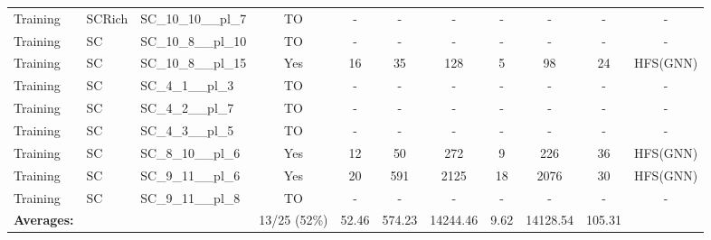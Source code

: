 \documentclass{article}
\begin{document}
\begin{tabular}{lllcccccccc}
Training & SCRich & SC\_10\_10\_\_pl\_7 & TO & - & - & - & - & - & - & - \\
Training & SC & SC\_10\_8\_\_pl\_10 & TO & - & - & - & - & - & - & - \\
Training & SC & SC\_10\_8\_\_pl\_15 & Yes & 16 & 35 & 128 & 5 & 98 & 24 & HFS(GNN) \\
Training & SC & SC\_4\_1\_\_pl\_3 & TO & - & - & - & - & - & - & - \\
Training & SC & SC\_4\_2\_\_pl\_7 & TO & - & - & - & - & - & - & - \\
Training & SC & SC\_4\_3\_\_pl\_5 & TO & - & - & - & - & - & - & - \\
Training & SC & SC\_8\_10\_\_pl\_6 & Yes & 12 & 50 & 272 & 9 & 226 & 36 & HFS(GNN) \\
Training & SC & SC\_9\_11\_\_pl\_6 & Yes & 20 & 591 & 2125 & 18 & 2076 & 30 & HFS(GNN) \\
Training & SC & SC\_9\_11\_\_pl\_8 & TO & - & - & - & - & - & - & - \\
\textbf{Averages:} & & & 13/25 (52\%) & 52.46 & 574.23 & 14244.46 & 9.62 & 14128.54 & 105.31 & \\
\bottomrule
\end{tabular}
\newpage
\end{document}
